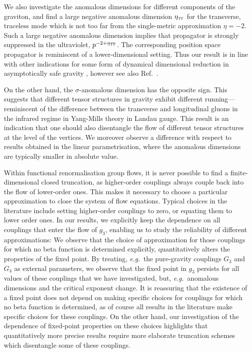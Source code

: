 \documentclass[11pt]{book}
\newcommand\TTspace{ -1pt }
\newcommand\etaTT{ \eta_{\scriptscriptstyle{\mathrm{T\hspace{\TTspace}T}}} }
\newcommand\eg{\textit{e.g.}\ }
\numberwithin{equation}{chapter}
\begin{document}
We also investigate the anomalous dimensions for different components of the graviton,
and find a large negative anomalous dimension $\etaTT$ for the transverse, traceless mode
which is not too far from the single-metric approximation $\eta=-2$.
Such a large negative anomalous dimension implies that propagator is strongly suppressed in the ultraviolet,
$p^{-2+\etaTT}$.
The corresponding position space propagator is reminiscent of a lower-dimensional setting.
Thus our result is in line with other indications for some form of dynamical dimensional reduction
in asymptotically safe gravity
\cite{Lauscher:2001ya, Lauscher:2005qz, Reuter:2011ah, Rechenberger:2012pm, Calcagni:2013vsa},
however see also Ref.~\cite{DOdorico:2015jtl}.

On the other hand, the  $\sigma$-anomalous dimension has the opposite sign.
This suggests that different tensor structures in gravity exhibit different running---reminiscent
of the difference between the transverse and longitudinal gluons in the infrared regime
in Yang-Mills theory in Landau gauge.
This result is an indication that one should also disentangle the flow of different tensor structures
at the level of the vertices.
We moreover observe a difference with respect to results obtained in the linear parametrisation,
where the anomalous dimensions are typically smaller in absolute value.

Within functional renormalisation group flows, it is never possible to find a finite-dimensional
closed truncation, as higher-order couplings always couple back into the flow of lower-order ones.
This makes it necessary to choose a particular approximation to close the system of flow equations.
Typical choices in the literature include setting higher-order couplings to zero,
or equating them to lower order ones. In our results,
we explicitly keep the dependence on all couplings that enter the flow of $g_3$,
enabling us to study the reliability of different approximations:
We observe that the choice of approximation for those couplings for which no beta function is
determined explicitly, quantitatively alters the properties of the fixed point. By treating,
\eg the pure-gravity couplings $G_3$ and $G_4$ as external parameters, we observe that the
fixed point in $g_3$ persists for all values of these couplings that we have investigated,
but, \eg anomalous dimensions and the critical exponent change.
It is reassuring that the existence of a fixed point does not  depend on making specific choices
for couplings for which no beta function is determined, as of course all results in the literature
make specific choices for these couplings.
On the other hand, our investigation of the dependence of fixed-point properties on these
choices highlights that quantitatively more precise results require more elaborate truncation
schemes which disentangle some of these couplings.
\end{document}
